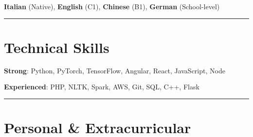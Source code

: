 \documentclass[10pt,a4paper,hidelinks]{article}
\newenvironment{indentsection}[1]%
{\begin{list}{}%
	{\setlength{\leftmargin}{#1}}%
	\item[]%
}
{\end{list}}
\begin{document}
\begin{indentsection}{\parindent}
\begin{flushleft}
    \textbf{Italian} (Native), \textbf{English} (C1),  \textbf{Chinese} (B1), \textbf{German} (School-level)
\end{flushleft}
\end{indentsection}



{\color{IFMediumGreen} \hrule}
\vspace{-0.3em}
{\color{IFDarkGreen}\section*{Technical Skills}}

\begin{indentsection}{\parindent}
\begin{flushleft}
   \textbf{Strong}: Python, PyTorch, TensorFlow, Angular, React, JavaScript, Node 
\end{flushleft}
\vspace{-1.0em}
\begin{flushleft}
   \textbf{Experienced}: PHP, NLTK, Spark, AWS, Git, SQL, C++, Flask
\end{flushleft}
\end{indentsection}



{\color{IFMediumGreen} \hrule}
\vspace{-0.3em}
{\color{IFDarkGreen}\section*{Personal \& Extracurricular}}
\end{document}
